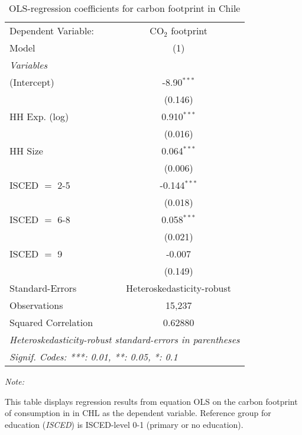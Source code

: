 
\begin{table}[htbp!]
   \centering
   \small
   \begin{adjustbox}{width = 1\textwidth, max height = 0.95\textheight, center}
      \begin{threeparttable}[b]
         \caption{\label{tab:OLS_2_CHL} OLS-regression coefficients for carbon footprint in Chile}
         \begin{tabular}{lc}
            \tabularnewline \midrule \midrule
            Dependent Variable: & CO$_{2}$ footprint\\  
            Model               & (1)\\  
            \midrule
            \emph{Variables}\\
            (Intercept)         & -8.90$^{***}$\\   
                                & (0.146)\\   
            HH Exp. (log)       & 0.910$^{***}$\\   
                                & (0.016)\\   
            HH Size             & 0.064$^{***}$\\   
                                & (0.006)\\   
            ISCED $=$ 2-5       & -0.144$^{***}$\\   
                                & (0.018)\\   
            ISCED $=$ 6-8       & 0.058$^{***}$\\   
                                & (0.021)\\   
            ISCED $=$ 9         & -0.007\\   
                                & (0.149)\\   
            \midrule 
            Standard-Errors     & Heteroskedasticity-robust \\   
            Observations        & 15,237\\  
            Squared Correlation & 0.62880\\  
            \midrule \midrule
            \multicolumn{2}{l}{\emph{Heteroskedasticity-robust standard-errors in parentheses}}\\
            \multicolumn{2}{l}{\emph{Signif. Codes: ***: 0.01, **: 0.05, *: 0.1}}\\
         \end{tabular}
         
         \begin{tablenotes}\item \medskip \textit{Note:}
            \item This table displays regression results from equation OLS on the carbon footprint of consumption in  in CHL as the dependent variable.  Reference group for education (\textit{ISCED}) is ISCED-level 0-1 (primary or no education).
         \end{tablenotes}
      \end{threeparttable}
   \end{adjustbox}
\end{table}


